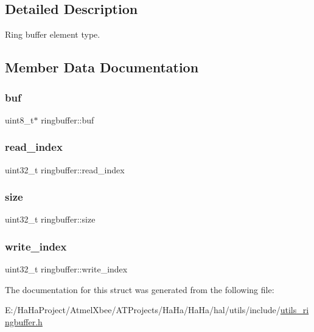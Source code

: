 \subsection{Detailed Description}
Ring buffer element type. 

\subsection{Member Data Documentation}
\mbox{\label{structringbuffer_a21e527bd1cee84a7b2c3d6d2da77584c}} 
\subsubsection{\texorpdfstring{buf}{buf}}
{\footnotesize\ttfamily uint8\+\_\+t$\ast$ ringbuffer\+::buf}

\mbox{\label{structringbuffer_a1690488f3cc00713f660ab13ee18be5e}} 
\subsubsection{\texorpdfstring{read\+\_\+index}{read\_index}}
{\footnotesize\ttfamily uint32\+\_\+t ringbuffer\+::read\+\_\+index}

\mbox{\label{structringbuffer_a80a0c2fba71bab6481fe1a0bab9685ae}} 
\subsubsection{\texorpdfstring{size}{size}}
{\footnotesize\ttfamily uint32\+\_\+t ringbuffer\+::size}

\mbox{\label{structringbuffer_a93936ef6a8e070e065448dbf49dcc93b}} 
\subsubsection{\texorpdfstring{write\+\_\+index}{write\_index}}
{\footnotesize\ttfamily uint32\+\_\+t ringbuffer\+::write\+\_\+index}



The documentation for this struct was generated from the following file\+:\begin{DoxyCompactItemize}
\item 
E\+:/\+Ha\+Ha\+Project/\+Atmel\+Xbee/\+A\+T\+Projects/\+Ha\+Ha/\+Ha\+Ha/hal/utils/include/\hyperlink{utils__ringbuffer_8h}{utils\+\_\+ringbuffer.\+h}\end{DoxyCompactItemize}

